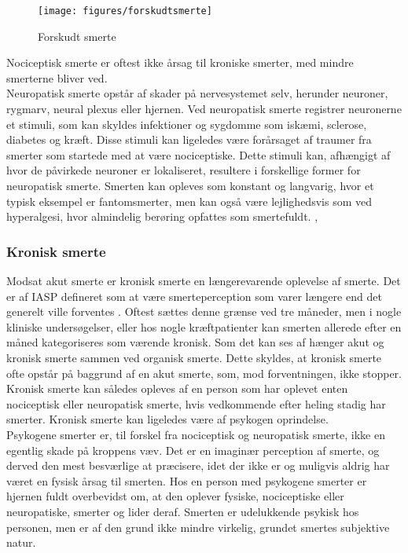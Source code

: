 \begin{figure}[H]
\begin{center}
\texttt{[image: figures/forskudtsmerte]}
	\caption{Forskudt smerte \citep{Martini}}
	\label{forskudtsmerte}
\end{center}
\end{figure}


Nociceptisk smerte er oftest ikke årsag til kroniske smerter, med mindre smerterne bliver ved.\\ 
Neuropatisk smerte opstår af skader på nervesystemet selv, herunder neuroner, rygmarv, neural plexus eller hjernen. 
Ved neuropatisk smerte registrer neuronerne et stimuli, som kan skyldes infektioner og sygdomme som iskæmi, sclerose, diabetes og kræft. Disse stimuli kan ligeledes være forårsaget af traumer fra smerter som startede med at være nociceptiske. Dette stimuli kan, afhængigt af hvor de påvirkede neuroner er lokaliseret, resultere i forskellige former for neuropatisk smerte. Smerten kan opleves som konstant og langvarig, hvor et typisk eksempel er fantomsmerter, men kan også være lejlighedsvis som ved hyperalgesi, hvor almindelig berøring opfattes som smertefuldt. \citep{Giangregorio1997}, \citep{Carmon}

\subsubsection{Kronisk smerte}
Modsat akut smerte er kronisk smerte en længerevarende oplevelse af smerte. Det er af IASP defineret som at være smerteperception som varer længere end det generelt ville forventes \citep{Carmon}. Oftest sættes denne grænse ved tre måneder, men i nogle kliniske undersøgelser, eller hos nogle kræftpatienter kan smerten allerede efter en måned kategoriseres som værende kronisk. Som det kan ses af  hænger akut og kronisk smerte sammen ved organisk smerte. Dette skyldes, at kronisk smerte ofte opstår på baggrund af en akut smerte, som, mod forventningen, ikke stopper. Kronisk smerte kan således opleves af en person som har oplevet enten nociceptisk eller neuropatisk smerte, hvis vedkommende efter heling stadig har smerter. Kronisk smerte kan ligeledes være af psykogen oprindelse.\\
Psykogene smerter er, til forskel fra nociceptisk og neuropatisk smerte, ikke en egentlig skade på kroppens væv. Det er en imaginær perception af smerte, og derved den mest besværlige at præcisere, idet der ikke er og muligvis aldrig har været en fysisk årsag til smerten. Hos en person med psykogene smerter er hjernen fuldt overbevidst om, at den oplever fysiske, nociceptiske eller neuropatiske, smerter og lider deraf. Smerten er udelukkende psykisk hos personen, men er af den grund ikke mindre virkelig, grundet smertes subjektive natur. \citep{Giangregorio1997}


